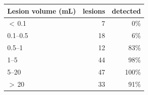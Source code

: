 \begin{tabular}{lrr}
\toprule
Lesion volume (mL) & lesions & detected \\
\midrule
$<$\,0.1 & 7 & 0\% \\
0.1--0.5 & 18 & 6\% \\
0.5--1 & 12 & 83\% \\
1--5 & 44 & 98\% \\
5--20 & 47 & 100\% \\
$>$\,20 & 33 & 91\% \\
\bottomrule
\end{tabular}
